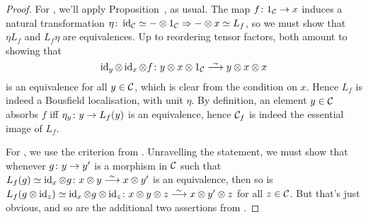 \begin{proof}
	For , we'll apply Proposition~, as usual. The map $f\colon 1_\Cc\morphism x$ induces a natural transformation $\eta\colon \operatorname{id}_{\mathcal{C}}\simeq -\otimes 1_{\mathcal{C}} \Rightarrow -\otimes x\simeq L_f$, so we must show that $\eta L_f$ and $L_f\eta$ are equivalences. Up to reordering tensor factors, both amount to showing that
	\begin{equation*}
		\id_y\otimes \id_x\otimes f\colon y\otimes x\otimes 1_\Cc\isomorphism y\otimes x\otimes x
	\end{equation*}
	is an equivalence for all $y\in \mathcal{C}$, which is clear from the condition on $x$. Hence $L_f$ is indeed a Bousfield localisation, with unit $\eta$. By definition, an element $y\in \mathcal{C}$ absorbs $f$ iff $\eta_y\colon y\morphism L_f(y)$ is an equivalence, hence $\mathcal{C}_f$ is indeed the essential image of $L_f$.
	
	For , we use the criterion from . Unravelling the statement, we must show that whenever $g\colon y\morphism y'$ is a morphism in $\mathcal{C}$ such that $L_f(g)\simeq \id_x\otimes g\colon x\otimes y\isomorphism x\otimes y'$ is an equivalence, then so is $L_f(g\otimes \id_z)\simeq \id_x\otimes g\otimes \id_z\colon x\otimes y\otimes z\isomorphism x\otimes y'\otimes z$ for all $z\in \mathcal{C}$. But that's just obvious, and so are the additional two assertions from .
	

\end{proof}
